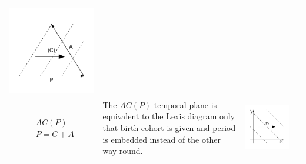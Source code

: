 \documentclass[
  12pt
]{scrartcl}
\begin{document}
\begin{center}
\begin{longtable}{m{}m{}m{}m{}}
  \includegraphics[width = \linewidth]{../fig/APc_iso.pdf}  \\
  \midrule
  $$\begin{aligned}
    &AC(P) \\
    &P = C + A
  \end{aligned}$$ &
  The $AC(P)$ temporal plane is equivalent to the Lexis diagram only that birth cohort is given and period is embedded instead of the other way round. &
  \includegraphics[width = \linewidth]{../fig/ACp.pdf} &

\end{longtable}
\end{center}
\end{document}
